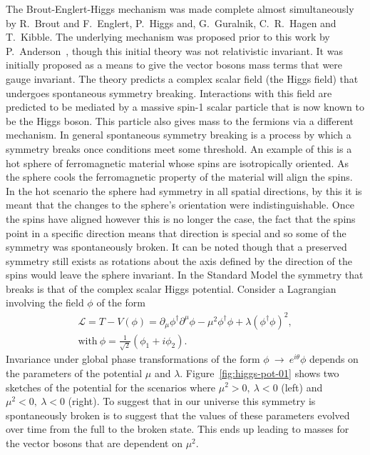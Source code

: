 The Brout-Englert-Higgs mechanism was made complete almost simultaneously by
R.~Brout and F.~Englert, P.~Higgs and, G.~Guralnik, C.~R.~Hagen and T.~Kibble.
The underlying mechanism was proposed prior to this work by
P.~Anderson~\cite{Anderson}, though this initial theory was not relativistic
invariant. It was initially proposed as a means to give the vector bosons mass
terms that were gauge invariant. The theory predicts a complex scalar field (the
Higgs field) that undergoes spontaneous symmetry breaking. Interactions with
this field are predicted to be mediated by a massive spin-1 scalar particle that
is now known to be the Higgs boson. This particle also gives mass to the
fermions via a different mechanism. In general spontaneous symmetry breaking is
a process by which a symmetry breaks once conditions meet some threshold. An
example of this is a hot sphere of ferromagnetic material whose spins are
isotropically oriented. As the sphere cools the ferromagnetic property of the
material will align the spins. In the hot scenario the sphere had symmetry in
all spatial directions, by this it is meant that the changes to the sphere's
orientation were indistinguishable. Once the spins have aligned however this is
no longer the case, the fact that the spins point in a specific direction means
that direction is special and so some of the symmetry was spontaneously broken.
It can be noted though that a preserved symmetry still exists as rotations about
the axis defined by the direction of the spins would leave the sphere invariant.
In the Standard Model the symmetry that breaks is that of the complex scalar
Higgs potential. Consider a Lagrangian involving the field $\phi$ of the form
\begin{gather} \mathcal{L} = T - V ( \phi ) = \partial_{\mu} \phi^{\dagger}
\partial^{\mu} \phi - \mu^{2} \phi^{\dagger} \phi + \lambda {( \phi^{\dagger}
\phi)}^{2}, \\ \text{with}~\phi =\frac{1}{\sqrt{2}}(\phi_{1} + i\phi_{2}).
\end{gather} Invariance under global phase transformations of the form
$\phi~\rightarrow~e^{i\theta}\phi$ depends on the parameters of the potential
$\mu$ and $\lambda$. Figure~\ref{fig:higgs-pot-01} shows two sketches of the
potential for the scenarios where $\mu^{2} > 0,~\lambda < 0$ (left) and $\mu^{2}
< 0,~\lambda < 0$ (right).  To suggest that
in our universe this symmetry is spontaneously broken is to suggest that the
values of these parameters evolved over time from the full to the broken state.
This ends up leading to masses for the vector bosons that are dependent on
$\mu^2$.

